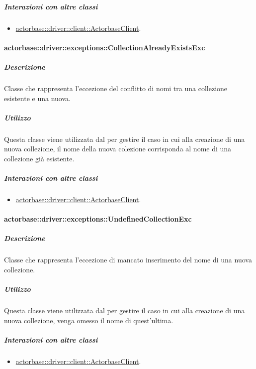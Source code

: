 \documentclass{scalatekids-article}
\begin{document}
\subparagraph{Interazioni con altre classi}

\begin{itemize}
\item \hyperref[sec:actorbase::driver::client::ActorbaseClient]{actorbase::driver::client::ActorbaseClient}.
\end{itemize}

\paragraph{actorbase::driver::exceptions::CollectionAlreadyExistsExc}

\subparagraph{Descrizione}

Classe che rappresenta l'eccezione del conflitto di nomi tra una collezione esistente e una nuova.

\subparagraph{Utilizzo}

Questa classe viene utilizzata dal  per gestire il caso in cui alla creazione di una nuova collezione, il nome della nuova colezione corrisponda al nome di una collezione già esistente.

\subparagraph{Interazioni con altre classi}

\begin{itemize}
\item \hyperref[sec:actorbase::driver::client::ActorbaseClient]{actorbase::driver::client::ActorbaseClient}.
\end{itemize}

\paragraph{actorbase::driver::exceptions::UndefinedCollectionExc}

\subparagraph{Descrizione}

Classe che rappresenta l'eccezione di mancato inserimento del nome di una nuova collezione.

\subparagraph{Utilizzo}

Questa classe viene utilizzata dal  per gestire il caso in cui alla creazione di una nuova collezione, venga omesso il nome di quest'ultima.

\subparagraph{Interazioni con altre classi}

\begin{itemize}
\item \hyperref[sec:actorbase::driver::client::ActorbaseClient]{actorbase::driver::client::ActorbaseClient}.
\end{itemize}
\end{document}
